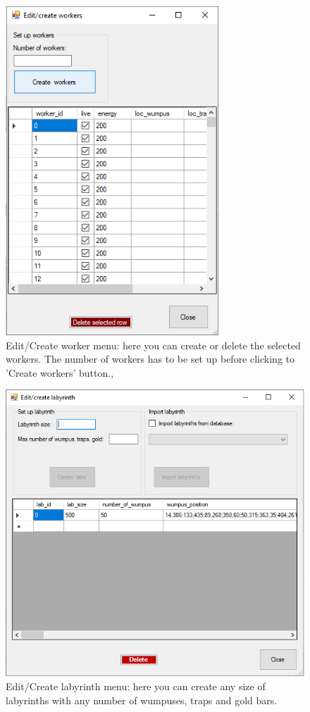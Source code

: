 \documentclass[a4paper,12pt]{article}
\begin{document}
\begin{figure}
	\begin{center}
		\includegraphics[width=8cm]{menu_create_workers.png}
		\caption{Edit/Create worker menu: here you can create or delete the selected workers. The number of workers has to be set up before clicking to 'Create workers' button., }
		\label{fig:menu_create_workers}
	\end{center}
\end{figure}

\begin{figure}
	\begin{center}
		\includegraphics[width=12cm]{mnu_createlabs.png}
		\caption{Edit/Create labyrinth menu: here you can create any size of labyrinths with any number of wumpuses, traps and gold bars.}
		\label{fig:mnu_createlabs}
	\end{center}
\end{figure}
\end{document}
